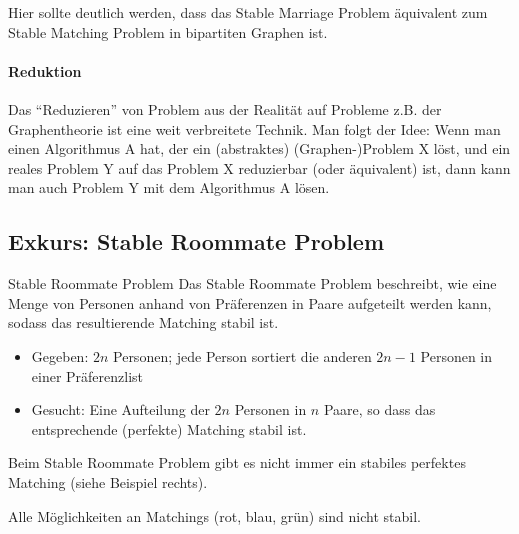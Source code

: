 \documentclass{panikzettel}
\begin{document}
Hier sollte deutlich werden, dass das Stable Marriage Problem äquivalent zum Stable Matching Problem in bipartiten Graphen ist.

\paragraph{Reduktion}\label{reduction} Das ``Reduzieren'' von Problem aus der Realität auf Probleme z.B. der Graphentheorie ist eine weit verbreitete Technik. Man folgt der Idee: Wenn man einen Algorithmus A hat, der ein (abstraktes) (Graphen-)Problem X löst, und ein reales Problem Y auf das Problem X reduzierbar (oder äquivalent) ist, dann kann man auch Problem Y mit dem Algorithmus A lösen.

\subsection{Exkurs: Stable Roommate Problem}

\begin{halfboxl}
	\vspace{-\baselineskip}
	\begin{defi}{Stable Roommate Problem}
		Das Stable Roommate Problem beschreibt, wie eine Menge von Personen anhand von Präferenzen in Paare aufgeteilt werden kann, sodass das resultierende Matching stabil ist.\\
		
		\begin{itemize}
			\item Gegeben: $2n$ Personen; jede Person sortiert die anderen $2n-1$ Personen in einer Präferenzlist
			\item Gesucht: Eine Aufteilung der $2n$ Personen in $n$ Paare, so dass das entsprechende (perfekte) Matching stabil ist.
		\end{itemize}
	
		Beim Stable Roommate Problem gibt es nicht immer ein stabiles perfektes Matching (siehe Beispiel rechts).
	\end{defi}
\end{halfboxl}%
\begin{halfboxr}
	\vspace{-\baselineskip}	
	\begin{center}
		
		Alle Möglichkeiten an Matchings (rot, blau, grün) sind nicht stabil.
	\end{center}
\end{halfboxr}
\end{document}
